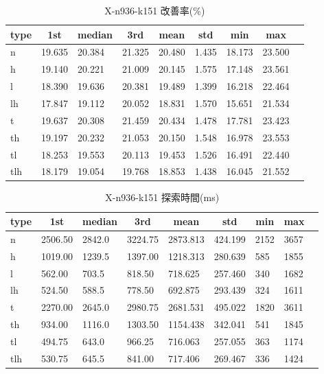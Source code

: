 \begin{table}[htbp]
    \centering
    \caption{X-n936-k151 改善率(\%)}
    \begin{tabular}{|l|l|l|l|l|l|l|l|l|}\hline
    \multicolumn{1}{|c|}{\textbf{type}}
    &\multicolumn{1}{|c|}{\textbf{1st}}
    &\multicolumn{1}{c|}{\textbf{median}}
    &\multicolumn{1}{c|}{\textbf{3rd}}
    &\multicolumn{1}{c|}{\textbf{mean}}
    &\multicolumn{1}{c|}{\textbf{std}}
    &\multicolumn{1}{c|}{\textbf{min}}
    &\multicolumn{1}{c|}{\textbf{max}}\\\hline
	n & 19.635 & 20.384 & 21.325 & 20.480 & 1.435 & 18.173 & 23.500\\\hline
	h & 19.140 & 20.221 & 21.009 & 20.145 & 1.575 & 17.148 & 23.561\\\hline
	l & 18.390 & 19.636 & 20.381 & 19.489 & 1.399 & 16.218 & 22.464\\\hline
	lh & 17.847 & 19.112 & 20.052 & 18.831 & 1.570 & 15.651 & 21.534\\\hline
	t & 19.637 & 20.308 & 21.459 & 20.434 & 1.478 & 17.781 & 23.423\\\hline
	th & 19.197 & 20.232 & 21.053 & 20.150 & 1.548 & 16.978 & 23.553\\\hline
	tl & 18.253 & 19.553 & 20.113 & 19.453 & 1.526 & 16.491 & 22.440\\\hline
	tlh & 18.179 & 19.054 & 19.768 & 18.853 & 1.438 & 16.045 & 21.552\\\hline
	\end{tabular}
\end{table}
\begin{table}[htbp]
    \centering
    \caption{X-n936-k151 探索時間(ms)}
    \begin{tabular}{|l|l|l|l|l|l|l|l|l|}\hline
    \multicolumn{1}{|c|}{\textbf{type}}
    &\multicolumn{1}{|c|}{\textbf{1st}}
    &\multicolumn{1}{c|}{\textbf{median}}
    &\multicolumn{1}{c|}{\textbf{3rd}}
    &\multicolumn{1}{c|}{\textbf{mean}}
    &\multicolumn{1}{c|}{\textbf{std}}
    &\multicolumn{1}{c|}{\textbf{min}}
    &\multicolumn{1}{c|}{\textbf{max}}\\\hline
	n & 2506.50 & 2842.0 & 3224.75 & 2873.813 & 424.199 & 2152 & 3657\\\hline
	h & 1019.00 & 1239.5 & 1397.00 & 1218.313 & 280.639 & 585 & 1855\\\hline
	l & 562.00 & 703.5 & 818.50 & 718.625 & 257.460 & 340 & 1682\\\hline
	lh & 524.50 & 588.5 & 778.50 & 692.875 & 293.439 & 324 & 1611\\\hline
	t & 2270.00 & 2645.0 & 2980.75 & 2681.531 & 495.022 & 1820 & 3611\\\hline
	th & 934.00 & 1116.0 & 1303.50 & 1154.438 & 342.041 & 541 & 1845\\\hline
	tl & 494.75 & 643.0 & 966.25 & 716.063 & 257.055 & 363 & 1174\\\hline
	tlh & 530.75 & 645.5 & 841.00 & 717.406 & 269.467 & 336 & 1424\\\hline
	\end{tabular}
\end{table}
